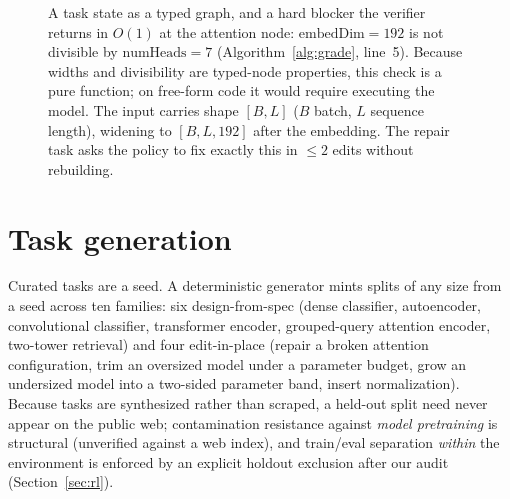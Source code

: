 \documentclass[11pt]{article}
\begin{document}
\begin{figure}[t]
\centering
{}
\caption{A task state as a typed graph, and a hard blocker the verifier returns in $O(1)$ at the attention node: $\text{embedDim}{=}192$ is not divisible by $\text{numHeads}{=}7$ (Algorithm~\ref{alg:grade}, line~5). Because widths and divisibility are typed-node properties, this check is a pure function; on free-form code it would require executing the model. The input carries shape $[B,L]$ ($B$ batch, $L$ sequence length), widening to $[B,L,192]$ after the embedding. The repair task asks the policy to fix exactly this in $\le 2$ edits without rebuilding.}
\label{fig:typedgraph}
\end{figure}

\section{Task generation}
Curated tasks are a seed. A deterministic generator mints splits of any size from a seed across ten families: six design-from-spec (dense classifier, autoencoder, convolutional classifier, transformer encoder, grouped-query attention encoder, two-tower retrieval) and four edit-in-place (repair a broken attention configuration, trim an oversized model under a parameter budget, grow an undersized model into a two-sided parameter band, insert normalization). Because tasks are synthesized rather than scraped, a held-out split need never appear on the public web; contamination resistance against \emph{model pretraining} is structural (unverified against a web index), and train/eval separation \emph{within} the environment is enforced by an explicit holdout exclusion after our audit (Section~\ref{sec:rl}).
\end{document}
